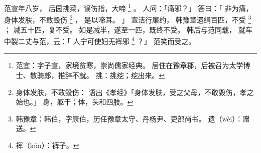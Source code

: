 
\switchcolumn*[\section{}]

范宣年八岁，
后园挑菜，误伤指，大啼%
\footnote{%
    范宜：字子宣，家境贫寒，崇尚儒家经典。
          居住在豫章郡，后被召为太学博士、散骑郎，推辞不就。
    挑：挑挖；挖出来。
}%
。
人问：「痛邪？」
答曰：「
    非为痛，
    身体发肤，不敢毁伤%
    \footnote{%
        身体发肤，不敢毁伤：
            语出《孝经》「身体发肤，受之父母，不敢毁伤，孝之始也。」
            身，躯干；体，头和四肢。
    }%
    ，
    是以啼耳。
」
宣洁行廉约，
韩豫章遗绢百匹，不受%
\footnote{%
    韩豫章：韩伯，字康伯，历任豫章太守、丹杨尹、吏部尚书。
    遗（wèi）：赠送。
}%
；
减五十匹，复不受。
如是减半，遂至一匹，既终不受。
韩后与范同载，
就车中裂二丈与范，云：「
    人宁可使妇无裈邪%
    \footnote{%
        裈（kūn）：裤子。
    }%
？」
范笑而受之。

\switchcolumn



